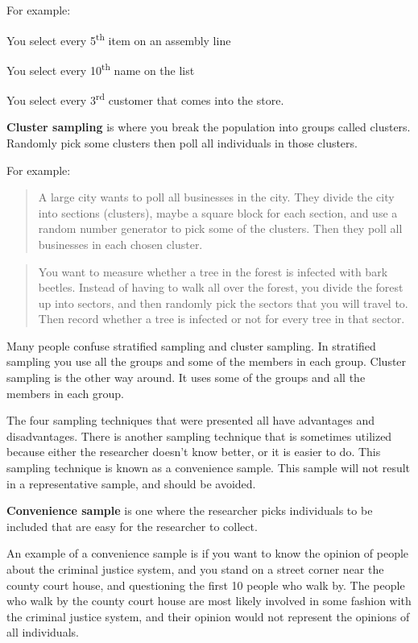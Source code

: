 \documentclass[]{book}
\begin{document}
For example:

You select every 5\textsuperscript{th} item on an assembly line

You select every 10\textsuperscript{th} name on the list

You select every 3\textsuperscript{rd} customer that comes into the store.

\textbf{Cluster sampling} is where you break the population into groups
called clusters. Randomly pick some clusters then poll all individuals
in those clusters.

For example:

\begin{quote}
A large city wants to poll all businesses in the city. They divide the city into sections (clusters), maybe a square block for each section, and use a random number generator to pick some of the clusters. Then they poll all businesses in each chosen cluster.
\end{quote}

\begin{quote}
You want to measure whether a tree in the forest is infected with bark beetles. Instead of having to walk all over the forest, you divide the forest up into sectors, and then randomly pick the sectors that you will travel to. Then record whether a tree is infected or not for every tree in that sector.
\end{quote}

Many people confuse stratified sampling and cluster sampling. In
stratified sampling you use {all} the groups and
{some} of the members in each group. Cluster sampling is the
other way around. It uses {some} of the groups and
{all} the members in each group.

The four sampling techniques that were presented all have advantages and
disadvantages. There is another sampling technique that is sometimes
utilized because either the researcher doesn't know better, or it is
easier to do. This sampling technique is known as a convenience sample.
This sample will not result in a representative sample, and should be
avoided.

\textbf{Convenience sample} is one where the researcher picks individuals to
be included that are easy for the researcher to collect.

An example of a convenience sample is if you want to know the opinion of
people about the criminal justice system, and you stand on a street
corner near the county court house, and questioning the first 10 people
who walk by. The people who walk by the county court house are most
likely involved in some fashion with the criminal justice system, and
their opinion would not represent the opinions of all individuals.
\end{document}
